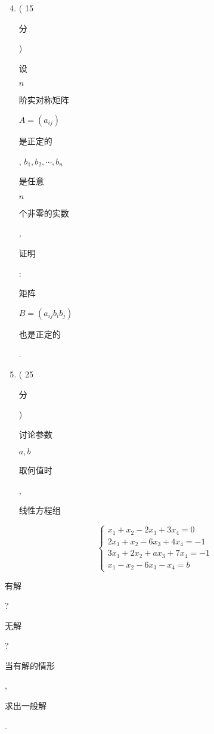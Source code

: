\documentclass[10pt]{article}
\begin{document}
\begin{enumerate}
  \setcounter{enumi}{3}
  \item ( 15 \begin{CJK}{UTF8}{mj}分\end{CJK}) \begin{CJK}{UTF8}{mj}设\end{CJK} $n$ \begin{CJK}{UTF8}{mj}阶实对称矩阵\end{CJK} $A=\left(a_{i j}\right)$ \begin{CJK}{UTF8}{mj}是正定的\end{CJK}, $b_{1}, b_{2}, \cdots, b_{n}$ \begin{CJK}{UTF8}{mj}是任意\end{CJK} $n$ \begin{CJK}{UTF8}{mj}个非零的实数\end{CJK}, \begin{CJK}{UTF8}{mj}证明\end{CJK}: \begin{CJK}{UTF8}{mj}矩阵\end{CJK} $B=\left(a_{i j} b_{i} b_{j}\right)$ \begin{CJK}{UTF8}{mj}也是正定的\end{CJK}.

  \item ( 25 \begin{CJK}{UTF8}{mj}分\end{CJK}) \begin{CJK}{UTF8}{mj}讨论参数\end{CJK} $a, b$ \begin{CJK}{UTF8}{mj}取何值时\end{CJK}, \begin{CJK}{UTF8}{mj}线性方程组\end{CJK}

\end{enumerate}
$$
\left\{\begin{array}{l}
x_{1}+x_{2}-2 x_{3}+3 x_{4}=0 \\
2 x_{1}+x_{2}-6 x_{3}+4 x_{4}=-1 \\
3 x_{1}+2 x_{2}+a x_{3}+7 x_{4}=-1 \\
x_{1}-x_{2}-6 x_{3}-x_{4}=b
\end{array}\right.
$$
\begin{CJK}{UTF8}{mj}有解\end{CJK}? \begin{CJK}{UTF8}{mj}无解\end{CJK}? \begin{CJK}{UTF8}{mj}当有解的情形\end{CJK}, \begin{CJK}{UTF8}{mj}求出一般解\end{CJK}.
\end{document}
